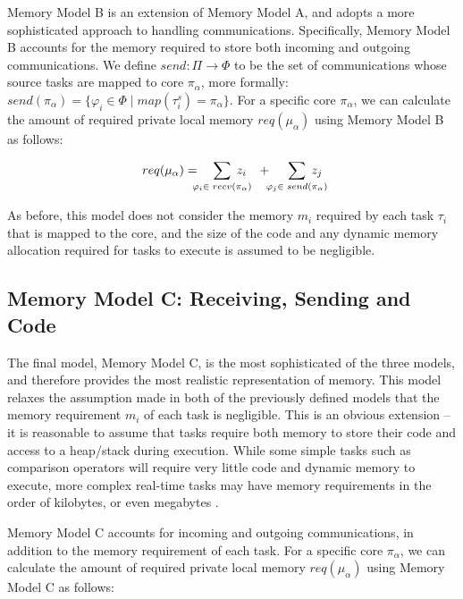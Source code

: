\documentclass[10pt,conference]{IEEEtran}
\begin{document}
Memory Model B is an extension of Memory Model A, and adopts a more sophisticated approach to handling communications. Specifically, Memory Model B accounts for the memory required to store both incoming and outgoing communications. We define $send : \Pi \rightarrow \Phi$ to be the set of communications whose source tasks are mapped to core $\pi_\alpha$, more formally: $send(\pi_\alpha) = \lbrace \varphi_i \in \Phi \mid map(\tau^s_i) = \pi_\alpha \rbrace$. For a specific core $\pi_\alpha$, we can calculate the amount of required private local memory $req(\mu_\alpha)$ using Memory Model B as follows:

\vspace{-0.5ex}
\begin{equation}
  \label{eq:memory-model-b}
  req(\mu_\alpha) =
  \phantom{...} \sum_{\mathclap{\varphi_i \in \phantom{.}recv(\pi_\alpha)}}\phantom{.} z_i
  \phantom{...}+\phantom{....} \sum_{\mathclap{\varphi_j \in \phantom{.}send(\pi_\alpha)}} \phantom{.} z_j
\end{equation}

As before, this model does not consider the memory $m_i$ required by each task $\tau_i$ that is mapped to the core, and the size of the code and any dynamic memory allocation required for tasks to execute is assumed to be negligible.

\subsection{Memory Model C: Receiving, Sending and Code}\label{sec:memory-model-c}

The final model, Memory Model C, is the most sophisticated of the three models, and therefore provides the most realistic representation of memory. This model relaxes the assumption made in both of the previously defined models that the memory requirement $m_i$ of each task is negligible. This is an obvious extension -- it is reasonable to assume that tasks require both memory to store their code and access to a heap/stack during execution. While some simple tasks such as comparison operators will require very little code and dynamic memory to execute, more complex real-time tasks may have memory requirements in the order of kilobytes, or even megabytes \cite{Shi10}.

Memory Model C accounts for incoming and outgoing communications, in addition to the memory requirement of each task. For a specific core $\pi_\alpha$, we can calculate the amount of required private local memory $req(\mu_\alpha)$ using Memory Model C as follows:
\end{document}
